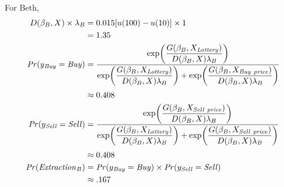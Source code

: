 \noindent For Beth,
\begin{align}
	\label{eq:Beth}
	\begin{split}
	D(\beta_B,X) \times \lambda_B &= 0.015[u(100) - u(10)] \times 1\\
	&= 1.35 \\
	{\mathit{Pr}}(y_{\mathit{Buy}} = \mathit{Buy}) &=\dfrac{\exp\!\left( \dfrac{ G(\beta_B,X_{\mathit{Lottery}}) }{ D(\beta_B,X)\lambda_B }  \right)}{ \exp\!\left( \dfrac{ G(\beta_B,X_{\mathit{Lottery}}) }{ D(\beta_B,X)\lambda_B }  \right) + \exp\!\left( \dfrac{ G(\beta_B,X_{\mathit{Buy\ price}}) }{ D(\beta_B,X)\lambda_B }  \right)  }\\[0.5ex]
	&\approx 0.408 \\
	{\mathit{Pr}}(y_{\mathit{Sell}} = \mathit{Sell}) &=\dfrac{\exp\!\left( \dfrac{ G(\beta_B,X_{\mathit{Sell\ price}}) }{ D(\beta_B,X)\lambda_B }  \right)}{ \exp\!\left( \dfrac{ G(\beta_B,X_{\mathit{Lottery}}) }{ D(\beta_B,X)\lambda_B }  \right) + \exp\!\left( \dfrac{ G(\beta_B,X_{\mathit{Sell\ price}}) }{ D(\beta_B,X)\lambda_B }  \right)  }\\[0.5ex]
	&\approx 0.408 \\
	{\mathit{Pr}}(\mathit{Extraction}_B) &= {\mathit{Pr}}(y_{\mathit{Buy}} = \mathit{Buy}) \times {\ensuremath{\mathit{Pr}}}(y_{\mathit{Sell}} = \mathit{Sell})\\
	&\approx .167
	\end{split}
\end{align}

